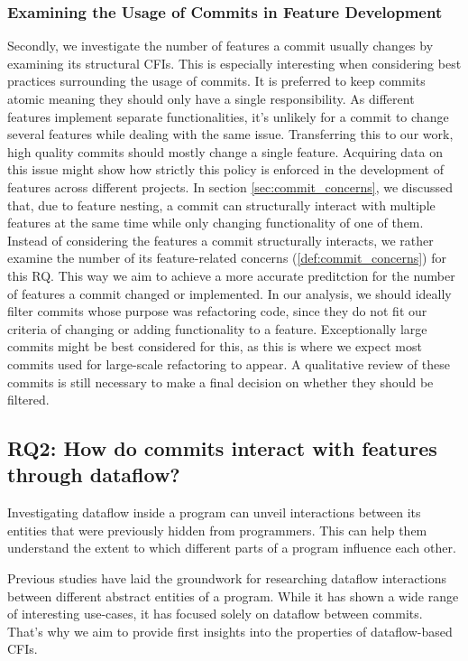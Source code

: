 \subsubsection*{Examining the Usage of Commits in Feature Development}

Secondly, we investigate the number of features a commit usually changes by examining its structural CFIs. 
This is especially interesting when considering best practices surrounding the usage of commits.
It is preferred to keep commits atomic\cite{hundhausen2021commit_metrics} meaning they should only have a single responsibility.
As different features implement separate functionalities, it's unlikely for a commit to change several features while dealing with the same issue.
Transferring this to our work, high quality commits should mostly change a single feature.
Acquiring data on this issue might show how strictly this policy is enforced in the development of features across different projects. 
In section \ref{sec:commit_concerns}, we discussed that, due to feature nesting, a commit can structurally interact with multiple features at the same time while only changing functionality of one of them.
Instead of considering the features a commit structurally interacts, we rather examine the number of its feature-related concerns (\ref{def:commit_concerns}) for this RQ.
This way we aim to achieve a more accurate preditction for the number of features a commit changed or implemented.
In our analysis, we should ideally filter commits whose purpose was refactoring code, since they do not fit our criteria of changing or adding functionality to a feature.
Exceptionally large commits might be best considered for this, as this is where we expect most commits used for large-scale refactoring to appear.
A qualitative review of these commits is still necessary to make a final decision on whether they should be filtered.

\subsection*{\textbf{RQ2: How do commits interact with features through dataflow?}}

Investigating dataflow inside a program can unveil interactions between its entities that were previously hidden from programmers.
This can help them understand the extent to which different parts of a program influence each other.

Previous studies have laid the groundwork for researching dataflow interactions between different abstract entities of a program.
While it has shown a wide range of interesting use-cases, it has focused solely on dataflow between commits.
That's why we aim to provide first insights into the properties of dataflow-based CFIs.

